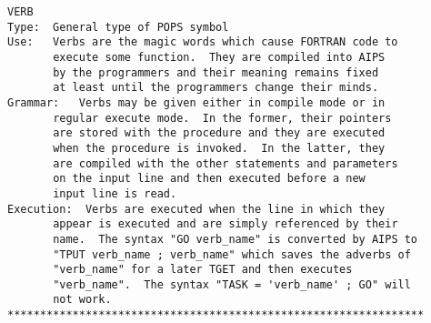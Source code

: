\vskip 0.5pt
\bbve\begin{verbatim}
VERB
Type:  General type of POPS symbol
Use:   Verbs are the magic words which cause FORTRAN code to
       execute some function.  They are compiled into AIPS
       by the programmers and their meaning remains fixed
       at least until the programmers change their minds.
Grammar:   Verbs may be given either in compile mode or in
       regular execute mode.  In the former, their pointers
       are stored with the procedure and they are executed
       when the procedure is invoked.  In the latter, they
       are compiled with the other statements and parameters
       on the input line and then executed before a new
       input line is read.
Execution:  Verbs are executed when the line in which they
       appear is executed and are simply referenced by their
       name.  The syntax "GO verb_name" is converted by AIPS to
       "TPUT verb_name ; verb_name" which saves the adverbs of
       "verb_name" for a later TGET and then executes
       "verb_name".  The syntax "TASK = 'verb_name' ; GO" will
       not work.
****************************************************************


\end{verbatim}
